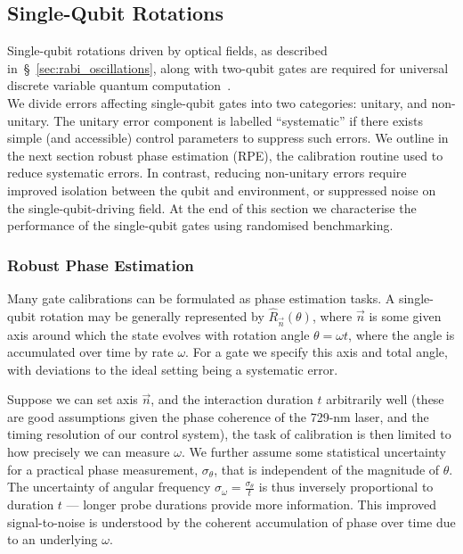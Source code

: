 \subsection{Single-Qubit Rotations}
\label{sec:Single Qubit Gates}

Single-qubit rotations driven by optical fields, as described in~\S~\ref{sec:rabi_oscillations}, along with two-qubit gates are required for universal discrete variable quantum computation~\cite{divincenzo_two-bit_1995}. \\

We divide errors affecting single-qubit gates into two categories: unitary, and non-unitary. The unitary error component is labelled ``systematic'' if there exists simple (and accessible) control parameters to suppress such errors. 
We outline in the next section robust phase estimation (RPE), the calibration routine used to reduce systematic errors. 
In contrast, reducing non-unitary errors require improved isolation between the qubit and environment, or suppressed noise on the single-qubit-driving field. At the end of this section we characterise the performance of the single-qubit gates using randomised benchmarking.

\subsubsection{Robust Phase Estimation}
\label{sec:RPE}

Many gate calibrations can be formulated as phase estimation tasks. A
single-qubit rotation may be generally represented by $\hat R_{\vec n}(\theta)$,
where $\vec n$ is some given axis around which the state evolves with rotation
angle $\theta=\omega t$, where the angle is accumulated over time by rate
$\omega$. For a gate we specify this axis and total angle, with deviations to the
ideal setting being a systematic error.

Suppose we can set axis $\vec n$, and
the interaction duration $t$ arbitrarily well (these are good assumptions given the phase coherence of the 729-nm laser, and the timing resolution of our control system), the task of calibration is then
limited to how precisely we can measure $\omega$. We further assume some
statistical uncertainty for a practical phase measurement, $\sigma_\theta$, that is
independent of the magnitude of $\theta$.
The uncertainty of angular frequency $\sigma_\omega=\frac{\sigma_\theta}{t}$ is thus 
inversely proportional to duration $t$ --- longer probe durations provide 
more information. This improved signal-to-noise is understood by the coherent
accumulation of phase over time due to an underlying $\omega$.

